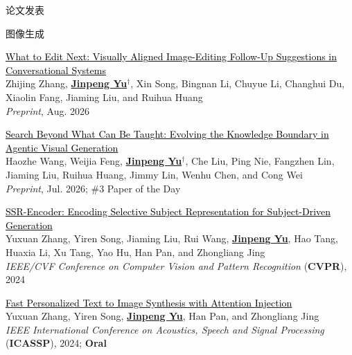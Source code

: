 \documentclass{resume} %
\newcommand{\publink}[2]{\href{#1}{\textcolor{black}{#2}}}
\begin{document}
\begin{rSection}{论文发表}
\begin{rSubsection}{\hspace*{-1.5em}图像生成}{}{}{}
\item \publink{https://what-to-edit-next.github.io/}{What to Edit Next: Visually Aligned Image-Editing Follow-Up Suggestions in Conversational Systems} \\
Zhijing Zhang, \underline{\bf Jinpeng Yu$^\dagger$}, Xin Song, Bingnan Li, Chuyue Li, Changhui Du, Xiaolin Fang, Jiaming Liu, and Ruihua Huang \\
{\em Preprint}, Aug. 2026
\item \publink{https://haozheh3.github.io/SearchGen/}{Search Beyond What Can Be Taught: Evolving the Knowledge Boundary in Agentic Visual Generation} \\
Haozhe Wang, Weijia Feng, \underline{\bf Jinpeng Yu$^\dagger$}, Che Liu, Ping Nie, Fangzhen Lin, Jiaming Liu, Ruihua Huang, Jimmy Lin, Wenhu Chen, and Cong Wei \\
{\em Preprint}, Jul. 2026; \#3 Paper of the Day
\item \publink{https://ssr-encoder.github.io/}{SSR-Encoder: Encoding Selective Subject Representation for Subject-Driven Generation} \\
Yuxuan Zhang, Yiren Song, Jiaming Liu, Rui Wang, \underline{\bf Jinpeng Yu}, Hao Tang, Huaxia Li, Xu Tang, Yao Hu, Han Pan, and Zhongliang Jing \\
{\em IEEE/CVF Conference on Computer Vision and Pattern Recognition} ({\bf CVPR}), 2024
\item \publink{https://arxiv.org/abs/2403.11284}{Fast Personalized Text to Image Synthesis with Attention Injection} \\
Yuxuan Zhang, Yiren Song, \underline{\bf Jinpeng Yu}, Han Pan, and Zhongliang Jing \\
{\em IEEE International Conference on Acoustics, Speech and Signal Processing} ({\bf ICASSP}), 2024; {\bf Oral}
\end{rSubsection}


\end{rSection}
\end{document}
